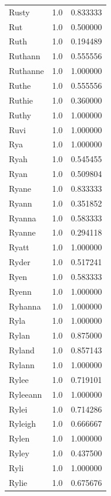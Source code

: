 \documentclass[
  letterpaper,
  DIV=11,
  numbers=noendperiod]{scrreprt}
\begin{document}
\begin{tabular}{lrr}
Rusty           &   1.0 &   0.833333 \\
Rut             &   1.0 &   0.500000 \\
Ruth            &   1.0 &   0.194489 \\
Ruthann         &   1.0 &   0.555556 \\
Ruthanne        &   1.0 &   1.000000 \\
Ruthe           &   1.0 &   0.555556 \\
Ruthie          &   1.0 &   0.360000 \\
Ruthy           &   1.0 &   1.000000 \\
Ruvi            &   1.0 &   1.000000 \\
Rya             &   1.0 &   1.000000 \\
Ryah            &   1.0 &   0.545455 \\
Ryan            &   1.0 &   0.509804 \\
Ryane           &   1.0 &   0.833333 \\
Ryann           &   1.0 &   0.351852 \\
Ryanna          &   1.0 &   0.583333 \\
Ryanne          &   1.0 &   0.294118 \\
Ryatt           &   1.0 &   1.000000 \\
Ryder           &   1.0 &   0.517241 \\
Ryen            &   1.0 &   0.583333 \\
Ryenn           &   1.0 &   1.000000 \\
Ryhanna         &   1.0 &   1.000000 \\
Ryla            &   1.0 &   1.000000 \\
Rylan           &   1.0 &   0.875000 \\
Ryland          &   1.0 &   0.857143 \\
Rylann          &   1.0 &   1.000000 \\
Rylee           &   1.0 &   0.719101 \\
Ryleeann        &   1.0 &   1.000000 \\
Rylei           &   1.0 &   0.714286 \\
Ryleigh         &   1.0 &   0.666667 \\
Rylen           &   1.0 &   1.000000 \\
Ryley           &   1.0 &   0.437500 \\
Ryli            &   1.0 &   1.000000 \\
Rylie           &   1.0 &   0.675676 \\

\end{tabular}
\end{document}

